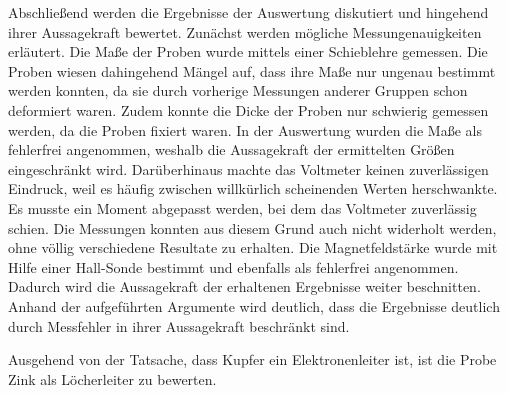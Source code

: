 Abschließend werden die Ergebnisse der Auswertung diskutiert und hingehend ihrer
Aussagekraft bewertet. Zunächst werden mögliche Messungenauigkeiten erläutert.
Die Maße der Proben wurde mittels einer Schieblehre gemessen. Die Proben wiesen
dahingehend Mängel auf, dass ihre Maße nur ungenau bestimmt werden konnten, da sie
durch vorherige Messungen anderer Gruppen schon deformiert waren. Zudem konnte
die Dicke der Proben nur schwierig gemessen werden, da die Proben fixiert waren.
In der Auswertung wurden die Maße als fehlerfrei angenommen, weshalb die Aussagekraft
der ermittelten Größen eingeschränkt wird. Darüberhinaus machte das Voltmeter keinen
zuverlässigen Eindruck, weil es häufig zwischen willkürlich scheinenden Werten
herschwankte. Es musste ein Moment abgepasst werden, bei dem das Voltmeter zuverlässig
schien. Die Messungen konnten aus diesem Grund auch nicht widerholt werden, ohne
völlig verschiedene Resultate zu erhalten. Die Magnetfeldstärke wurde mit Hilfe
einer Hall-Sonde bestimmt und ebenfalls als fehlerfrei angenommen.
Dadurch wird die Aussagekraft der erhaltenen Ergebnisse weiter beschnitten.
Anhand der aufgeführten Argumente wird deutlich, dass die Ergebnisse deutlich
durch Messfehler in ihrer Aussagekraft beschränkt sind.

Ausgehend von der Tatsache, dass Kupfer ein Elektronenleiter ist, ist die
Probe Zink als Löcherleiter zu bewerten.



